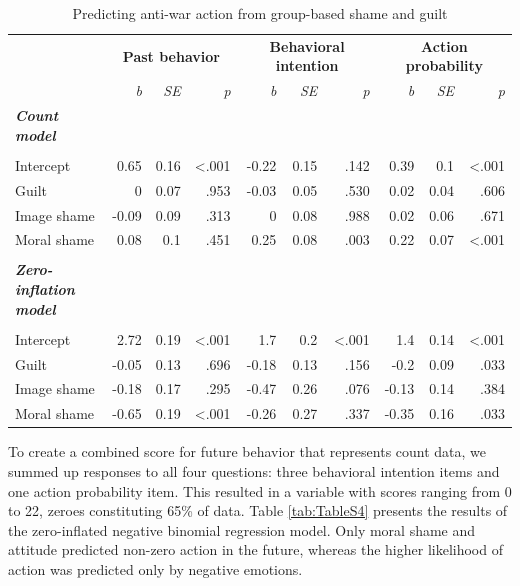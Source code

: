 \documentclass[
]{article}
\begin{document}
\begin{table}[H]
\centering
\caption{\label{tab:TableS3}Predicting anti-war action from group-based shame and guilt}
\centering
\fontsize{8}{10}\selectfont
\begin{tabular}[t]{lrrrrrrrrr}
\toprule
\multicolumn{1}{c}{\textbf{}} & \multicolumn{3}{c}{\textbf{Past behavior}} & \multicolumn{3}{c}{\textbf{Behavioral intention}} & \multicolumn{3}{c}{\textbf{Action probability}} \\
\cmidrule(l{3pt}r{3pt}){2-4} \cmidrule(l{3pt}r{3pt}){5-7} \cmidrule(l{3pt}r{3pt}){8-10}
\em{ } & \em{b} & \em{SE} & \em{p} & \em{b} & \em{SE} & \em{p} & \em{b} & \em{SE} & \em{p}\\
\midrule
\em{\textbf{Count model}} & \em{\textbf{}} & \em{\textbf{}} & \em{\textbf{}} & \em{\textbf{}} & \em{\textbf{}} & \em{\textbf{}} & \em{\textbf{}} & \em{\textbf{}} & \em{\textbf{}}\\
\midrule\\
Intercept & 0.65 & 0.16 & <.001 & -0.22 & 0.15 & .142 & 0.39 & 0.1 & <.001\\
Guilt & 0 & 0.07 & .953 & -0.03 & 0.05 & .530 & 0.02 & 0.04 & .606\\
Image shame & -0.09 & 0.09 & .313 & 0 & 0.08 & .988 & 0.02 & 0.06 & .671\\
Moral shame & 0.08 & 0.1 & .451 & 0.25 & 0.08 & .003 & 0.22 & 0.07 & <.001\\
\midrule\\
\addlinespace
\em{\textbf{Zero-inflation model}} & \em{\textbf{}} & \em{\textbf{}} & \em{\textbf{}} & \em{\textbf{}} & \em{\textbf{}} & \em{\textbf{}} & \em{\textbf{}} & \em{\textbf{}} & \em{\textbf{}}\\
\midrule\\
Intercept & 2.72 & 0.19 & <.001 & 1.7 & 0.2 & <.001 & 1.4 & 0.14 & <.001\\
Guilt & -0.05 & 0.13 & .696 & -0.18 & 0.13 & .156 & -0.2 & 0.09 & .033\\
Image shame & -0.18 & 0.17 & .295 & -0.47 & 0.26 & .076 & -0.13 & 0.14 & .384\\
Moral shame & -0.65 & 0.19 & <.001 & -0.26 & 0.27 & .337 & -0.35 & 0.16 & .033\\
\bottomrule
\end{tabular}
\end{table}

To create a combined score for future behavior that represents count data, we summed up responses to all four questions: three behavioral intention items and one action probability item. This resulted in a variable with scores ranging from 0 to 22, zeroes constituting 65\% of data. Table \ref{tab:TableS4} presents the results of the zero-inflated negative binomial regression model. Only moral shame and attitude predicted non-zero action in the future, whereas the higher likelihood of action was predicted only by negative emotions.
\end{document}
